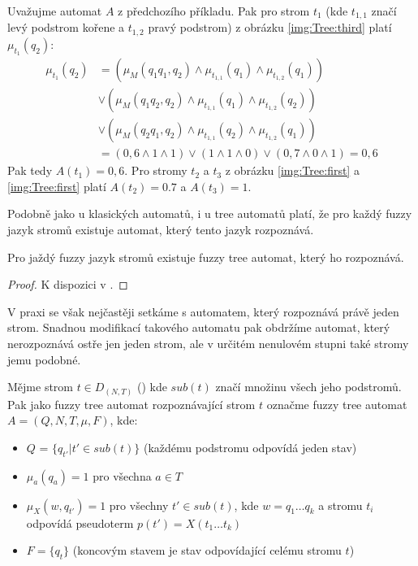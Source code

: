 \documentclass[a4paper,10pt]{article}
\begin{document}
\begin{example}
 Uvažujme automat $A$ z předchozího příkladu. Pak pro strom $t_1$ (kde $t_{1,1}$ značí levý podstrom kořene a $t_{1,2}$ pravý podstrom) z obrázku \ref{img:Tree:third} platí $\mu_{t_1}(q_2)$:
 \begin{align*}
  \mu_{t_1}(q_2) 
    &= 		\left( \mu_M(q_1 q_1, q_2) \wedge \mu_{t_{1,1}}(q_1) \wedge \mu_{t_{1,2}}(q_1) \right) \\
    &\vee 	\left( \mu_M(q_1 q_2, q_2) \wedge \mu_{t_{1,1}}(q_1) \wedge \mu_{t_{1,2}}(q_2) \right) \\ 
    &\vee 	\left( \mu_M(q_2 q_1, q_2) \wedge \mu_{t_{1,1}}(q_2) \wedge \mu_{t_{1,2}}(q_1) \right) \\ 
    &= \left( 0,6 \wedge 1 \wedge 1 \right) \vee \left( 1 \wedge 1 \wedge 0 \right) \vee \left( 0,7 \wedge 0 \wedge 1 \right) 
    = 0,6
 \end{align*}
 Pak tedy $A(t_1) = 0,6$. Pro stromy $t_2$ a $t_3$ z obrázku \ref{img:Tree:first} a \ref{img:Tree:first} platí $A(t_2) = 0.7$ a $A(t_3) = 1$.
\end{example}

Podobně jako u klasických automatů, i u tree automatů platí, že pro každý fuzzy jazyk stromů existuje automat, který tento jazyk rozpoznává.
\begin{theorem}
 Pro jaždý fuzzy jazyk stromů existuje fuzzy tree automat, který ho rozpoznává.
\end{theorem}
\begin{proof}
 K dispozici v \cite{MorMal-FuzzyLangThe}.
\end{proof}

V praxi se však nejčastěji setkáme s automatem, který rozpoznává právě jeden strom. Snadnou modifikací takového automatu pak obdržíme automat, který nerozpoznává ostře jen jeden strom, ale v určitém nenulovém stupni také stromy jemu podobné.

\begin{definition}
  Mějme strom $t \in D_{(N, T)}$ () kde $sub(t)$ značí množinu všech jeho podstromů. Pak jako fuzzy tree automat rozpoznávající strom $t$ označme fuzzy tree automat $A = (Q, N, T, \mu, F)$, kde:
  \begin{itemize}
   \item $Q$ = $\{ q_{t'} | t' \in sub(t) \}$ (každému podstromu odpovídá jeden stav)
   \item $\mu_a(q_a) = 1$ pro všechna $a \in T$
   \item $\mu_X(w, q_{t'}) = 1$ pro všechny $t' \in sub(t)$, kde $w = q_1 \dots q_k$ a stromu $t_i$ odpovídá pseudoterm $p(t') = X(t_1 \dots t_k)$
   \item $F = \{ q_t \}$ (koncovým stavem je stav odpovídající celému stromu $t$)
  \end{itemize}
\end{definition}
\end{document}
